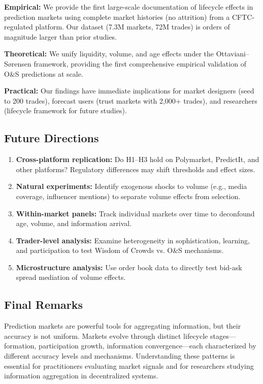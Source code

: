 \documentclass[12pt,letterpaper]{article}
\begin{document}
\textbf{Empirical:} We provide the first large-scale documentation of lifecycle effects in prediction markets using complete market histories (no attrition) from a CFTC-regulated platform. Our dataset (7.3M markets, 72M trades) is orders of magnitude larger than prior studies.

\textbf{Theoretical:} We unify liquidity, volume, and age effects under the Ottaviani--S{\o}rensen framework, providing the first comprehensive empirical validation of O\&S predictions at scale.

\textbf{Practical:} Our findings have immediate implications for market designers (seed to 200 trades), forecast users (trust markets with 2,000+ trades), and researchers (lifecycle framework for future studies).

\subsection{Future Directions}

\begin{enumerate}
    \item \textbf{Cross-platform replication:} Do H1--H3 hold on Polymarket, PredictIt, and other platforms? Regulatory differences may shift thresholds and effect sizes.
    
    \item \textbf{Natural experiments:} Identify exogenous shocks to volume (e.g., media coverage, influencer mentions) to separate volume effects from selection.
    
    \item \textbf{Within-market panels:} Track individual markets over time to deconfound age, volume, and information arrival.
    
    \item \textbf{Trader-level analysis:} Examine heterogeneity in sophistication, learning, and participation to test Wisdom of Crowds vs. O\&S mechanisms.
    
    \item \textbf{Microstructure analysis:} Use order book data to directly test bid-ask spread mediation of volume effects.
\end{enumerate}

\subsection{Final Remarks}

Prediction markets are powerful tools for aggregating information, but their accuracy is not uniform. Markets evolve through distinct lifecycle stages---formation, participation growth, information convergence---each characterized by different accuracy levels and mechanisms. Understanding these patterns is essential for practitioners evaluating market signals and for researchers studying information aggregation in decentralized systems.
\end{document}
